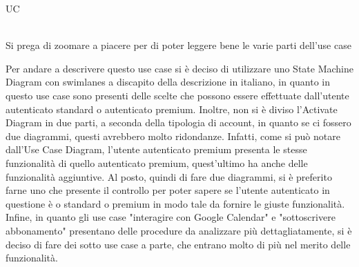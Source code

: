 \begin{listaPersonale}{UC}
\begin{listaPersonale2}[UC] {}


    \end{listaPersonale2}





    \newpage

    \begin{center}
        \\
        Si prega di zoomare a piacere per di poter leggere bene le varie parti dell'use case
    \end{center}
    Per andare a descrivere questo use case si è deciso di utilizzare uno State Machine Diagram con swimlanes a discapito della descrizione in italiano, in quanto in questo use case sono presenti delle scelte che possono essere effettuate dall'utente autenticato standard o autenticato premium. Inoltre, non si è diviso l'Activate Diagram in due parti, a seconda della tipologia di account, in quanto se ci fossero due diagrammi, questi avrebbero molto ridondanze. Infatti, come si può notare dall'Use Case Diagram, l'utente autenticato premium presenta le stesse funzionalità di quello autenticato premium, quest'ultimo ha anche delle funzionalità aggiuntive. Al posto, quindi di fare due diagrammi, si è preferito farne uno che presente il controllo per poter sapere se l'utente autenticato in questione è o standard o premium in modo tale da fornire le giuste funzionalità.
    Infine, in quanto gli use case "interagire con Google Calendar" e "sottoscrivere abbonamento" presentano delle procedure da analizzare più dettagliatamente, si è deciso di fare dei sotto use case a parte, che entrano molto di più nel merito delle funzionalità.


\end{listaPersonale}
